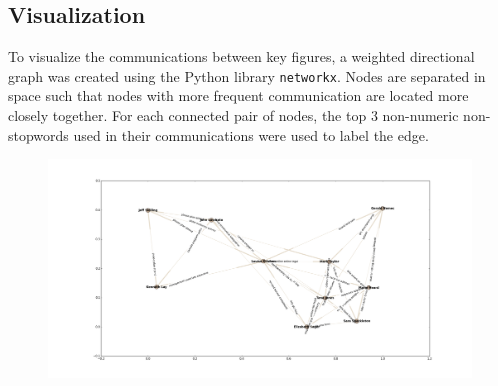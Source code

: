\documentclass{article}
\begin{document}
\subsection{Visualization}
To visualize the communications between key figures, a weighted directional graph was created using the Python library \texttt{networkx}. Nodes are separated in space such that nodes with more frequent communication are located more closely together. For each connected pair of nodes, the top 3 non-numeric non-stopwords used in their communications were used to label the edge. 

\begin{figure}[ht!]
\centering
\includegraphics[width=165mm]{figure_6.png}
\end{figure}
\end{document}
